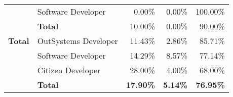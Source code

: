 \begin{table}[tb]
\begin{tabular}{llrrr}
                            & Software Developer   & 0.00\%                                                            & 0.00\%                                                                  & 100.00\%                                                      \\
                            & \textbf{Total}       & 10.00\%                                                           & 0.00\%                                                                  & 90.00\%                                                       \\ \hline
  \rowcolor[HTML]{EFEFEF} 
  \textbf{Total}            & OutSystems Developer & 11.43\%                                                           & 2.86\%                                                                  & 85.71\%                                                       \\
  \rowcolor[HTML]{EFEFEF} 
                            & Software Developer   & 14.29\%                                                           & 8.57\%                                                                  & 77.14\%                                                       \\
  \rowcolor[HTML]{EFEFEF} 
                            & Citizen Developer    & 28.00\%                                                           & 4.00\%                                                                  & 68.00\%                                                       \\
  \rowcolor[HTML]{EFEFEF} 
                            & \textbf{Total}       & \textbf{17.90\%}                                                  & \textbf{5.14\%}                                                         & \textbf{76.95\%}                                              \\ \hline
  \end{tabular}
  \end{table}





